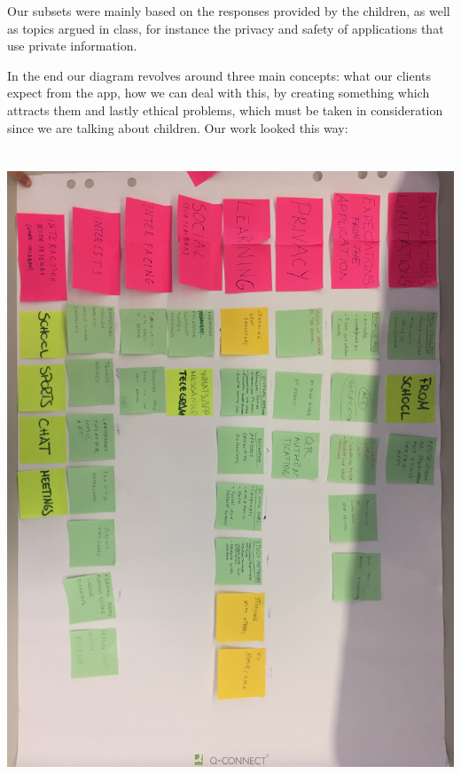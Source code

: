 \documentclass[12pt]{report}
\begin{document}
	Our subsets were mainly based on the responses provided by the children, 
	as well as topics argued in class, for instance the privacy and safety of 
	applications that use private information.
	
	In the end our diagram revolves around three main concepts: 
	what our clients expect from the app, how we can deal with this, by creating something which attracts them 
	and lastly ethical problems, which must be taken in consideration since we are talking about
	children. Our work looked this way: \\\\\\
	\includegraphics[width = 1.0\linewidth]{affinity_diagram.jpg}\break
\end{document}
